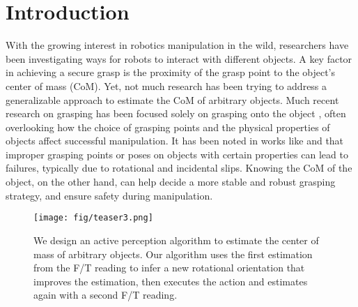 \section{Introduction}

With the growing interest in robotics manipulation in the wild, researchers have been investigating ways for robots to interact with different objects. A key factor in achieving a secure grasp is the proximity of the grasp point to the object's center of mass (CoM). Yet, not much research has been trying to address a generalizable approach to estimate the CoM of arbitrary objects. Much recent research on grasping has been focused solely on grasping onto the object \cite{kosmose24} \cite{yuchen23}, often overlooking how the choice of grasping points and the physical properties of objects affect successful manipulation. It has been noted in works like \cite{Poseit} and \cite{rotate_stability} that improper grasping points or poses on objects with certain properties can lead to failures, typically due to rotational and incidental slips. Knowing the CoM of the object, on the other hand, can help decide a more stable and robust grasping strategy, and ensure safety during manipulation.


\begin{figure}[htbp]
\vspace{-5mm}
\begin{center}
\texttt{[image: fig/teaser3.png]}
\end{center}
\caption{We design an active perception algorithm to estimate the center of mass of arbitrary objects. Our algorithm uses the first estimation from the F/T reading to infer a new rotational orientation that improves the estimation, then executes the action and estimates again with a second F/T reading. }
\label{teaser}
\vspace{-5mm}
\end{figure}


